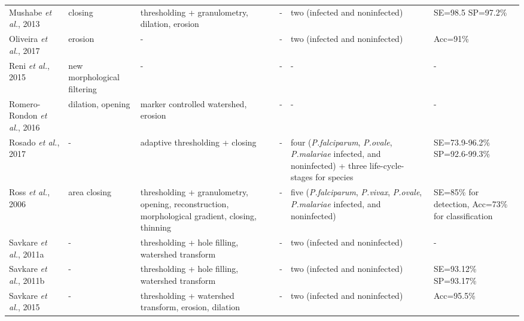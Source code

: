 \begin{longtable}{C{2.1cm} C{2.4cm} C{2.3cm} H C{2.7cm} C{2.2cm} }
	Mushabe \emph{et al.}, 2013  &
	closing &
	thresholding + granulometry, dilation, erosion  &
	- &
	two (infected and noninfected) &
	SE=98.5 SP=97.2\% \vspace{0.6cm} \\	
	
	Oliveira \emph{et al.}, 2017  &
	erosion &
	-  &
	- &
	two (infected and noninfected) &
	Acc=91\% \vspace{0.6cm} \\
	
	Reni \emph{et al.}, 2015  &
	new morphological filtering &
	-  &
	- &
	- &
	- \vspace{0.6cm} \\
	
	Romero-Rondon \emph{et al.}, 2016  &
	dilation, opening &
	marker controlled watershed, erosion  &
	- &
	- &
	- \vspace{0.6cm} \\
	
	Rosado \emph{et al.}, 2017  &
	- &
	adaptive thresholding + closing  &
	- &
	four (\emph{P.falciparum}, \emph{P.ovale}, \emph{P.malariae} infected, and noninfected) +
	three life-cycle-stages for species &
	SE=73.9-96.2\% SP=92.6-99.3\% \vspace{0.6cm} \\
	
	Ross \emph{et al.}, 2006  &
	area closing &
	thresholding + granulometry, opening, reconstruction, morphological gradient, closing, thinning  &
	- &
	five (\emph{P.falciparum}, \emph{P.vivax}, \emph{P.ovale}, \emph{P.malariae} infected, and noninfected) &
	SE=85\% for detection, Acc=73\% for classification
	\vspace{0.6cm} \\
	
	
	Savkare \emph{et al.}, 2011a  &
	- &
	thresholding + hole filling, watershed transform  &
	- &
	two (infected and noninfected) &
	- \vspace{0.6cm} \\
	
	Savkare \emph{et al.}, 2011b  &
	- &
	thresholding + hole filling, watershed transform  &
	- &
	two (infected and noninfected) &
	SE=93.12\% SP=93.17\% \vspace{0.6cm} \\
	
	Savkare \emph{et al.}, 2015  &
	- &
	thresholding + watershed transform, erosion, dilation  &
	- &
	two (infected and noninfected) &
	Acc=95.5\% \vspace{0.6cm} \\
	

\end{longtable}
